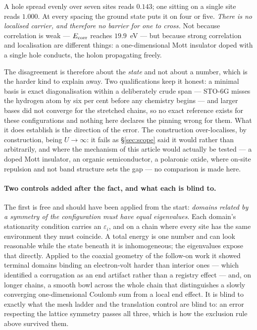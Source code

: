 \documentclass[11pt]{article}
\begin{document}
\noindent A hole spread evenly over seven sites reads $0.143$; one sitting on a single site reads
$1.000$. At every spacing the ground state puts it on four or five. \emph{There is no localised
carrier, and therefore no barrier for one to cross.} Not because correlation is weak ---
$E_{\rm corr}$ reaches $19.9$~eV --- but because strong correlation and localisation are different
things: a one-dimensional Mott insulator doped with a single hole conducts, the holon propagating
freely.

The disagreement is therefore about the \emph{state} and not about a number, which is the harder
kind to explain away. Two qualifications keep it honest: a minimal basis is exact diagonalisation
within a deliberately crude span --- STO-6G misses the hydrogen atom by six per cent before any
chemistry begins --- and larger bases did not converge for the stretched chains, so no exact
reference exists for these configurations and nothing here declares the pinning wrong for them. What
it does establish is the direction of the error. The construction over-localises, by construction,
being $U\to\infty$: it fails as \S\ref{sec:scope} said it would rather than arbitrarily, and where
the mechanism of this article would actually be tested --- a doped Mott insulator, an organic
semiconductor, a polaronic oxide, where on-site repulsion and not band structure sets the gap --- no
comparison is made here.


\paragraph{Two controls added after the fact, and what each is blind to.} The first is free and
should have been applied from the start: \emph{domains related by a symmetry of the configuration
must have equal eigenvalues}. Each domain's stationarity condition carries an $\varepsilon_i$, and on
a chain where every site has the same environment they must coincide. A total energy is one number
and can look reasonable while the state beneath it is inhomogeneous; the eigenvalues expose that
directly. Applied to the coaxial geometry of the follow-on work it showed terminal domains binding an
electron-volt harder than interior ones --- which identified a corrugation as an end artifact rather
than a registry effect --- and, on longer chains, a smooth bowl across the whole chain that
distinguishes a slowly converging one-dimensional Coulomb sum from a local end effect. It is blind
to exactly what the mesh ladder and the translation control are blind to: an error respecting the
lattice symmetry passes all three, which is how the exclusion rule above survived them.
\end{document}
